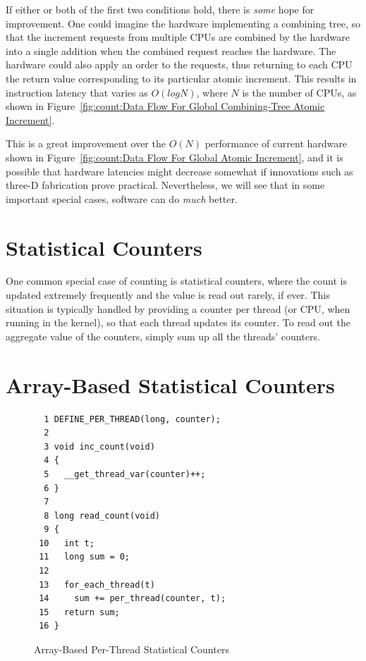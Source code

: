 {	If either or both of the first two conditions hold, there is
	\emph{some} hope for improvement.
	One could imagine the hardware implementing a combining tree,
	so that the increment requests from multiple CPUs are combined
	by the hardware into a single addition when the combined request
	reaches the hardware.
	The hardware could also apply an order to the requests, thus
	returning to each CPU the return value corresponding to its
	particular atomic increment.
	This results in instruction latency that varies as $O(log N)$,
	where $N$ is the number of CPUs, as shown in
	Figure~\ref{fig:count:Data Flow For Global Combining-Tree Atomic Increment}.

	This is a great improvement over the $O(N)$ performance
	of current hardware shown in
	Figure~\ref{fig:count:Data Flow For Global Atomic Increment},
	and it is possible that hardware latencies might decrease
	somewhat if innovations such as three-D fabrication prove
	practical.
	Nevertheless, we will see that in some important special cases,
	software can do \emph{much} better.
} \QuickQuizEnd

\section{Statistical Counters}
\label{sec:count:Statistical Counters}

One common special case of counting is statistical counters, where
the count is updated extremely frequently and the value is read out
rarely, if ever.
This situation is typically handled by providing a counter per
thread (or CPU, when running in the kernel), so that each thread
updates its counter.
To read out the aggregate value of the counters, simply sum up
all the threads' counters.

\section{Array-Based Statistical Counters}
\label{sec:count:Array-Based Statistical Counters}

\begin{figure}[bp]
{ \scriptsize
\begin{verbatim}
  1 DEFINE_PER_THREAD(long, counter);
  2 
  3 void inc_count(void)
  4 {
  5   __get_thread_var(counter)++;
  6 }
  7 
  8 long read_count(void)
  9 {
 10   int t;
 11   long sum = 0;
 12 
 13   for_each_thread(t)
 14     sum += per_thread(counter, t);
 15   return sum;
 16 }
\end{verbatim}
}
\caption{Array-Based Per-Thread Statistical Counters}
\label{fig:count:Array-Based Per-Thread Statistical Counters}
\end{figure}

